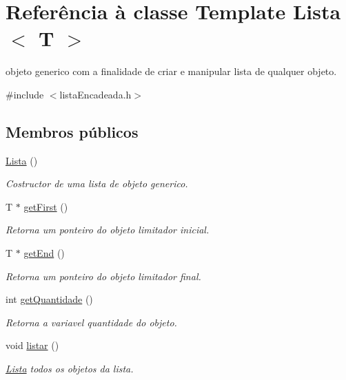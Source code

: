 \hypertarget{class_lista}{}\section{Referência à classe Template Lista$<$ T $>$}
\label{class_lista}


objeto generico com a finalidade de criar e manipular lista de qualquer objeto.  




{\ttfamily \#include $<$lista\+Encadeada.\+h$>$}

\subsection*{Membros públicos}
\begin{DoxyCompactItemize}
\item 
\hyperlink{class_lista_adce924e21607848663132290be1a959d}{Lista} ()
\begin{DoxyCompactList}\small\item\em Costructor de uma lista de objeto generico. \end{DoxyCompactList}\item 
T $\ast$ \hyperlink{class_lista_afa9f5ea1b06315bb169fb408423e4518}{get\+First} ()
\begin{DoxyCompactList}\small\item\em Retorna um ponteiro do objeto limitador inicial. \end{DoxyCompactList}\item 
T $\ast$ \hyperlink{class_lista_a13bf54ce03e9e8b03f372a65dc309d9e}{get\+End} ()
\begin{DoxyCompactList}\small\item\em Retorna um ponteiro do objeto limitador final. \end{DoxyCompactList}\item 
int \hyperlink{class_lista_a8d4437d6cb6d0e1a92fc47ee05a35910}{get\+Quantidade} ()
\begin{DoxyCompactList}\small\item\em Retorna a variavel quantidade do objeto. \end{DoxyCompactList}\item 
void \hyperlink{class_lista_a3d52d4f2e1199eef12dd28450d889b68}{listar} ()
\begin{DoxyCompactList}\small\item\em \hyperlink{class_lista}{Lista} todos os objetos da lista. \end{DoxyCompactList}\item 

\end{DoxyCompactItemize}
